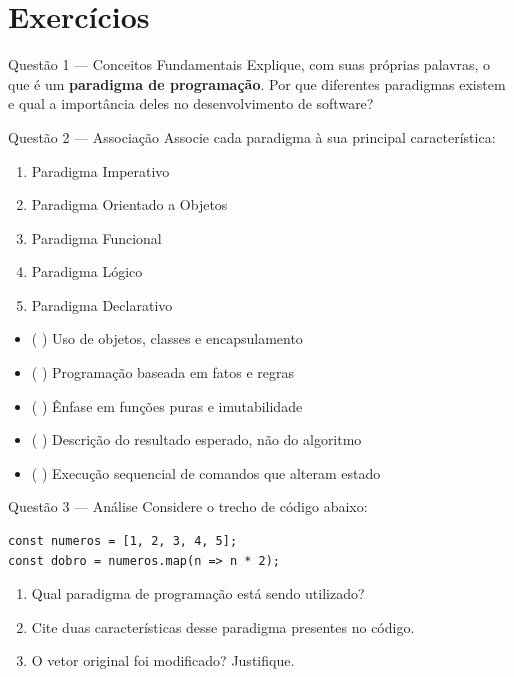 \documentclass[12pt]{article}
\begin{document}

\vspace*{0.2cm}

\section*{Exercícios}

\begin{block}{Questão 1 — Conceitos Fundamentais}
Explique, com suas próprias palavras, o que é um \textbf{paradigma de programação}.
Por que diferentes paradigmas existem e qual a importância deles no desenvolvimento
de software?
\end{block}

\begin{block}{Questão 2 — Associação}
Associe cada paradigma à sua principal característica:

\begin{enumerate}[label=\alph*)]
  \item Paradigma Imperativo
  \item Paradigma Orientado a Objetos
  \item Paradigma Funcional
  \item Paradigma Lógico
  \item Paradigma Declarativo
\end{enumerate}

\begin{itemize}
  \item ( \quad ) Uso de objetos, classes e encapsulamento
  \item ( \quad ) Programação baseada em fatos e regras
  \item ( \quad ) Ênfase em funções puras e imutabilidade
  \item ( \quad ) Descrição do resultado esperado, não do algoritmo
  \item ( \quad ) Execução sequencial de comandos que alteram estado
\end{itemize}
\end{block}

\begin{block}{Questão 3 — Análise}
Considere o trecho de código abaixo:

\begin{verbatim}
const numeros = [1, 2, 3, 4, 5];
const dobro = numeros.map(n => n * 2);
\end{verbatim}

\begin{enumerate}
  \item Qual paradigma de programação está sendo utilizado?
  \item Cite duas características desse paradigma presentes no código.
  \item O vetor original foi modificado? Justifique.
\end{enumerate}
\end{block}
\end{document}
